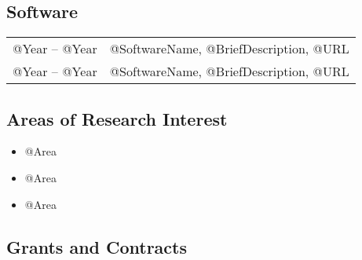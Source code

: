 \documentclass[10pt]{article}
\begin{document}
\subsection*{Software}
\smallskip

\begin{tabular}{l@{\quad\ }l} 
 @Year -- @Year
 & @SoftwareName, @BriefDescription, @URL
\\[0.5ex]
 @Year -- @Year
 & @SoftwareName, @BriefDescription, @URL
\end{tabular}

\begin{IOWA ONLY}
\subsection*{Areas of Research Interest}
\smallskip

\begin{itemize} \setlength{\itemsep}{0ex}
 \item [] @Area
 \item [] @Area
 \item [] @Area
\end{itemize}
\end{IOWA ONLY}

\subsection*{Grants and Contracts}
\smallskip
\end{document}

